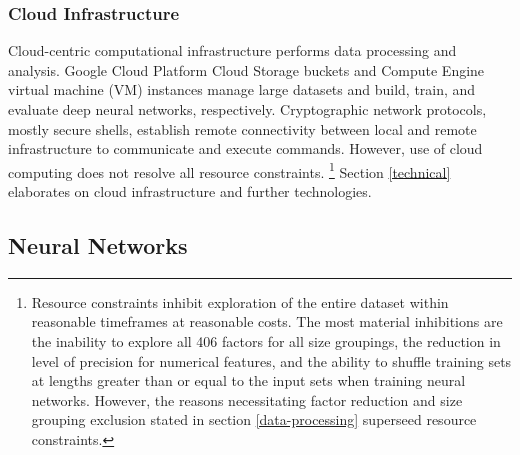 \documentclass[12pt]{article}
\begin{document}
\subsubsection*{Cloud Infrastructure}
Cloud-centric computational infrastructure performs data processing and analysis.
Google Cloud Platform Cloud Storage buckets and Compute Engine virtual machine (VM) instances manage large datasets and build, train, and evaluate deep neural networks, respectively.
Cryptographic network protocols, mostly secure shells, establish remote connectivity between local and remote infrastructure to communicate and execute commands.
However, use of cloud computing does not resolve all resource constraints. 
\footnote{Resource constraints inhibit exploration of the entire dataset within reasonable timeframes at reasonable costs.
The most material inhibitions are the inability to explore all 406 factors for all size groupings, the reduction in level of precision for numerical features, and
the ability to shuffle training sets at lengths greater than or equal to the input sets when training neural networks.
However, the reasons necessitating factor reduction and size grouping exclusion stated in section \ref{data-processing} superseed resource constraints.}
Section \ref{technical} elaborates on cloud infrastructure and further technologies.

\subsection{Neural Networks}
\end{document}
